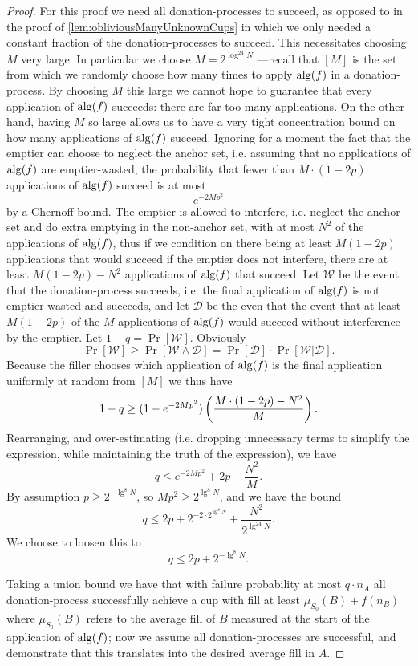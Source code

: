 \begin{proof}
  For this proof we need all donation-processes to succeed, as
  opposed to in the proof of \cref{lem:obliviousManyUnknownCups}
  in which we only needed a constant fraction of the
  donation-processes to succeed. This necessitates choosing $M$
  very large. In particular we choose $M = 2^{\log^{24} N}$
  ---recall that $[M]$ is the set from which we randomly choose
  how many times to apply $\operatorname{\text{\textup{alg}}}(f)$ in a donation-process. 
  By choosing $M$ this large we cannot hope to guarantee that
  every application of $\operatorname{\text{\textup{alg}}}(f)$ succeeds: there are far too many
  applications. On the other hand, having $M$ so large allows us
  to have a very tight concentration bound on how many
  applications of $\operatorname{\text{\textup{alg}}}(f)$ succeed. 
  Ignoring for a moment the fact that the emptier can choose to
  neglect the anchor set, i.e. assuming that no applications of
  $\operatorname{\text{\textup{alg}}}(f)$ are emptier-wasted, the probability
  that fewer than $M\cdot (1-2p)$ applications of $\operatorname{\text{\textup{alg}}}(f)$
  succeed is at most $$e^{-2Mp^2}$$ by a Chernoff bound.
  The emptier is allowed to interfere, i.e. neglect the anchor
  set and do extra emptying in the non-anchor set, with at most $N^2$ of the
  applications of $\operatorname{\text{\textup{alg}}}(f)$, thus if we condition on there being
  at least $M(1-2p)$ applications that would succeed if the emptier
  does not interfere, there are at least $M(1-2p)-N^2$ applications of
  $\operatorname{\text{\textup{alg}}}(f)$ that succeed. 
  Let $\mathcal{W}$ be the event that the donation-process
  succeeds, i.e. the final application of $\operatorname{\text{\textup{alg}}}(f)$ is not
  emptier-wasted and succeeds, and let $\mathcal{D}$ be the even
  that the event that at least $M(1-2p)$ of the $M$ applications
  of $\operatorname{\text{\textup{alg}}}(f)$ would succeed without  interference by the
  emptier.
  Let $1-q = \Pr[\mathcal{W}]$.
  Obviously 
  $$\Pr[\mathcal{W}] \ge \Pr[\mathcal{W} \land \mathcal{D}] =
  \Pr[\mathcal{D}] \cdot \Pr[\mathcal{W} | \mathcal{D}].$$
  Because the filler chooses which application of $\operatorname{\text{\textup{alg}}}(f)$ is the final
  application uniformly at random from $[M]$ we thus have
  $$1-q \ge (1-e^{-2Mp^2})\left( \frac{M\cdot (1-2p)-N^2}{M} \right).$$
  Rearranging, and over-estimating (i.e. dropping unnecessary
  terms to simplify the expression, while maintaining the truth
  of the expression), we have 
  $$q \le e^{-2Mp^2} + 2p + \frac{N^2}{M}.$$
  By assumption $p \ge 2^{-\lg^8 N}$, so $Mp^2 \ge 2^{\lg^8 N}$,
  and we have the bound
  $$q \le 2p + 2^{-2\cdot 2^{\lg^8 N}} + \frac{N^2}{2^{\lg^{24} N}}.$$
  We choose to loosen this to 
  $$q \le 2p + 2^{-\lg^8 N}.$$

  Taking a union bound we have that with failure probability at
  most $q \cdot n_A$ all donation-process successfully achieve a cup
  with fill at least $\mu_{S_0}(B) + f(n_B)$ where $\mu_{S_0}(B)$
  refers to the average fill of $B$ measured at the start of the
  application of $\operatorname{\text{\textup{alg}}}(f)$; now we assume all donation-processes
  are successful, and demonstrate that this translates into the
  desired average fill in $A$.


\end{proof}
